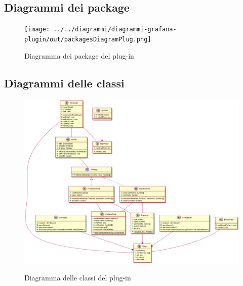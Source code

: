 \documentclass[../specifica-tecnica.tex]{subfiles}
\begin{document}
\subsection{Diagrammi dei package}
\begin{figure}[H]
  \begin{center}
    \texttt{[image: ../../diagrammi/diagrammi-grafana-plugin/out/packagesDiagramPlug.png]}\\
    \caption{Diagramma dei package del plug-in}%
  \end{center}
\end{figure}

\newpage

\subsection{Diagrammi delle classi}
\begin{figure}[H]
  \begin{center}
    \includegraphics[width=18cm]{../../diagrammi/diagrammi-grafana-plugin/out/GrafanaClasses.png}\\
    \caption{Diagramma delle classi del plug-in}%
  \end{center}
\end{figure}

\newpage
\end{document}
